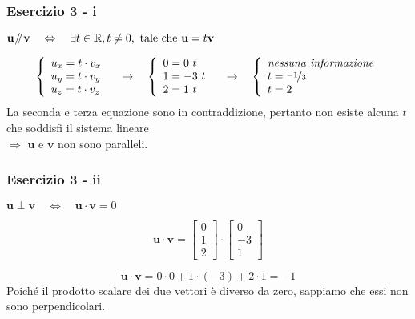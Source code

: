 \documentclass{beamer}
\newcommand{\parallelsum}{\mathbin{\!/\mkern-5mu/\!}}
\begin{document}
\begin{frame}

\frametitle{Esercizio 3 - i}
 $\mathbf{u} \parallelsum \mathbf{v} \quad \Leftrightarrow \quad \exists t \in \mathbb R, t\neq 0,\ \text{tale che } \mathbf u = t\mathbf v$

\begin{equation*}
 \left\{
 \begin{array}{l}
  u_x = t\cdot v_x \\
  u_y = t\cdot v_y \\
  u_z = t\cdot v_z
 \end{array}
 \right. 
 \quad \rightarrow \quad
  \left\{
 \begin{array}{l}
  0 = 0\ t \\
  1 = -3\ t \\
  2 = 1\ t
 \end{array}
 \right.
 \quad \rightarrow \quad
  \left\{
 \begin{array}{l}
  \mathit{nessuna\ informazione} \\
  t = \nicefrac{-1}{3} \\
  t = 2
 \end{array}
 \right.
\end{equation*}
La seconda e terza equazione sono in contraddizione, pertanto non esiste alcuna $t$ che soddisfi il sistema lineare \\
$\Rightarrow$ $\mathbf{u}$ e $\mathbf{v}$ non sono paralleli.
\end{frame}

\begin{frame}

\frametitle{Esercizio 3 - ii}
$\mathbf{u} \perp \mathbf{v} \quad \Leftrightarrow \quad \mathbf u \cdot \mathbf v = 0$

\begin{displaymath}
\mathbf u \cdot \mathbf v =  \begin{bmatrix}
                0 \\
                1 \\
                2 
                \end{bmatrix}
    \cdot \begin{bmatrix}
                0 \\
                -3\\
                1
                \end{bmatrix}
\end{displaymath}

\begin{displaymath}
\mathbf u \cdot \mathbf v
 =  0 \cdot 0 + 1 \cdot (-3) + 2 \cdot 1 = -1
\end{displaymath}
Poich\'e il prodotto scalare dei due vettori \`e diverso da zero, sappiamo
che essi non sono perpendicolari.
\end{frame}
\end{document}
